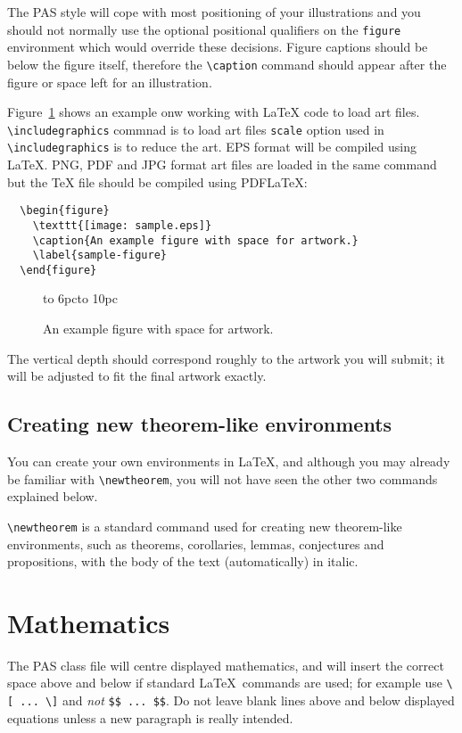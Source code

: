 \documentclass{pas}
\begin{document}
The PAS style will cope with most positioning of your illustrations
and you should not normally use the optional positional qualifiers on
the \verb"figure" environment which would override these decisions.
Figure captions should be below the figure itself, therefore the \verb"\caption"
command should appear after the figure or space left for an illustration.

Figure~\ref{sample-figure} shows an example onw working with LaTeX code to load art files. \verb"\includegraphics" commnad is to load art files \verb"scale" option used in \verb"\includegraphics" is to reduce the art. EPS format will be compiled using LaTeX. PNG, PDF and JPG format art files are loaded in the same command but the TeX file should be compiled using PDFLaTeX:
%
\begin{verbatim}
  \begin{figure}
    \texttt{[image: sample.eps]}
    \caption{An example figure with space for artwork.}
    \label{sample-figure}
  \end{figure}
\end{verbatim}
%
\begin{figure}[t]
  \centerline{\vbox to 6pc{\hbox to 10pc{}}}
  \caption{An example figure with space for artwork.}
  \label{sample-figure}
\end{figure}
%
The vertical depth should correspond roughly to the artwork you will submit;
it will be adjusted to fit the final artwork exactly.

\subsection{Creating new theorem-like environments}

You can create your own environments in \LaTeX, and although you may already
be familiar with \verb"\newtheorem", you will not have seen the other two
commands explained below.

\verb"\newtheorem" is a standard command used for creating new
        theorem-like environments, such as theorems, corollaries, lemmas,
        conjectures and propositions, with the body of the text
        (automatically) in italic.

\section{Mathematics}

The PAS class file will centre displayed mathematics, and will insert the
correct space above and below if standard \LaTeX\ commands are used; for
example use \verb"\[ ... \]" and \emph{not} \verb"$$ ... $$". Do not leave
blank lines above and below displayed equations unless a new paragraph is
really intended.
\end{document}
